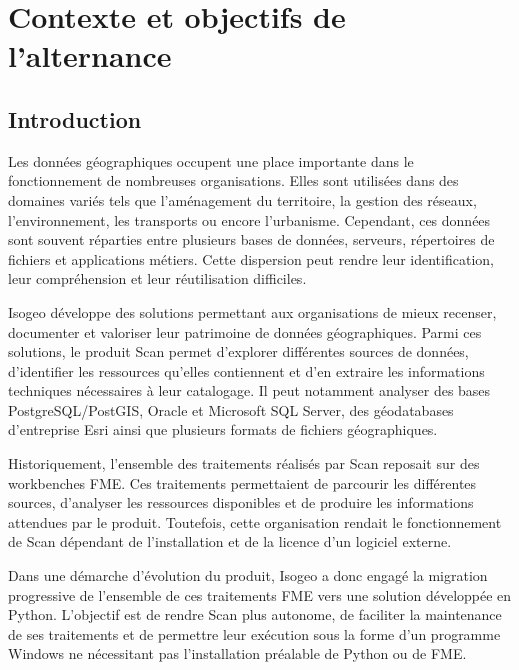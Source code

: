 

\chapter{Contexte et objectifs de l'alternance}
\label{chap:contexte_objectifs}

\section{Introduction}
\label{sec:introduction_chapitre_1}

Les données géographiques occupent une place importante dans le fonctionnement
de nombreuses organisations. Elles sont utilisées dans des domaines variés tels
que l'aménagement du territoire, la gestion des réseaux, l'environnement, les
transports ou encore l'urbanisme. Cependant, ces données sont souvent réparties
entre plusieurs bases de données, serveurs, répertoires de fichiers et
applications métiers. Cette dispersion peut rendre leur identification, leur
compréhension et leur réutilisation difficiles.

Isogeo développe des solutions permettant aux organisations de mieux recenser,
documenter et valoriser leur patrimoine de données géographiques. Parmi ces
solutions, le produit Scan permet d'explorer différentes sources de données,
d'identifier les ressources qu'elles contiennent et d'en extraire les
informations techniques nécessaires à leur catalogage. Il peut notamment
analyser des bases PostgreSQL/PostGIS, Oracle et Microsoft SQL Server, des
géodatabases d'entreprise Esri ainsi que plusieurs formats de fichiers
géographiques.

Historiquement, l'ensemble des traitements réalisés par Scan reposait sur des
workbenches FME. Ces traitements permettaient de parcourir les différentes
sources, d'analyser les ressources disponibles et de produire les informations
attendues par le produit. Toutefois, cette organisation rendait le
fonctionnement de Scan dépendant de l'installation et de la licence d'un
logiciel externe.

Dans une démarche d'évolution du produit, Isogeo a donc engagé la migration
progressive de l'ensemble de ces traitements FME vers une solution développée
en Python. L'objectif est de rendre Scan plus autonome, de faciliter la
maintenance de ses traitements et de permettre leur exécution sous la forme
d'un programme Windows ne nécessitant pas l'installation préalable de Python ou
de FME.

